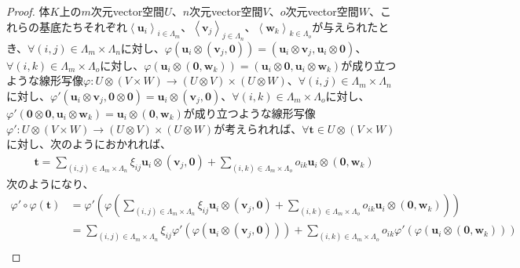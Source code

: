 \documentclass[dvipdfmx]{jsarticle}
\begin{document}
\begin{proof}
体$K$上の$m$次元vector空間$U$、$n$次元vector空間$V$、$o$次元vector空間$W$、これらの基底たちそれぞれ$\left\langle \mathbf{u}_{i} \right\rangle_{i \in \varLambda_{m}}$、$\left\langle \mathbf{v}_{j} \right\rangle_{j \in \varLambda_{n}}$、$\left\langle \mathbf{w}_{k} \right\rangle_{k \in \varLambda_{o}}$が与えられたとき、$\forall(i,j) \in \varLambda_{m} \times \varLambda_{n}$に対し、$\varphi\left( \mathbf{u}_{i} \otimes \left( \mathbf{v}_{j},\mathbf{0} \right) \right) = \left( \mathbf{u}_{i} \otimes \mathbf{v}_{j},\mathbf{u}_{i} \otimes \mathbf{0} \right)$、$\forall(i,k) \in \varLambda_{m} \times \varLambda_{o}$に対し、$\varphi\left( \mathbf{u}_{i} \otimes \left( \mathbf{0},\mathbf{w}_{k} \right) \right) = \left( \mathbf{u}_{i} \otimes \mathbf{0},\mathbf{u}_{i} \otimes \mathbf{w}_{k} \right)$が成り立つような線形写像$\varphi:U \otimes (V \times W) \rightarrow (U \otimes V) \times (U \otimes W)$、$\forall(i,j) \in \varLambda_{m} \times \varLambda_{n}$に対し、$\varphi'\left( \mathbf{u}_{i} \otimes \mathbf{v}_{j},\mathbf{0} \otimes \mathbf{0} \right) = \mathbf{u}_{i} \otimes \left( \mathbf{v}_{j},\mathbf{0} \right)$、$\forall(i,k) \in \varLambda_{m} \times \varLambda_{o}$に対し、$\varphi'\left( \mathbf{0} \otimes \mathbf{0},\mathbf{u}_{i} \otimes \mathbf{w}_{k} \right) = \mathbf{u}_{i} \otimes \left( \mathbf{0},\mathbf{w}_{k} \right)$が成り立つような線形写像$\varphi':U \otimes (V \times W) \rightarrow (U \otimes V) \times (U \otimes W)$が考えられれば、$\forall\mathbf{t} \in U \otimes (V \times W)$に対し、次のようにおかれれば、
\begin{align*}
\mathbf{t} = \sum_{(i,j) \in \varLambda_{m} \times \varLambda_{n}} {\xi_{ij}\mathbf{u}_{i} \otimes \left( \mathbf{v}_{j},\mathbf{0} \right)} + \sum_{(i,k) \in \varLambda_{m} \times \varLambda_{o}} {o_{ik}\mathbf{u}_{i} \otimes \left( \mathbf{0},\mathbf{w}_{k} \right)}
\end{align*}
次のようになり、
\begin{align*}
\varphi' \circ \varphi\left( \mathbf{t} \right) &= \varphi'\left( \varphi\left( \sum_{(i,j) \in \varLambda_{m} \times \varLambda_{n}} {\xi_{ij}\mathbf{u}_{i} \otimes \left( \mathbf{v}_{j},\mathbf{0} \right)} + \sum_{(i,k) \in \varLambda_{m} \times \varLambda_{o}} {o_{ik}\mathbf{u}_{i} \otimes \left( \mathbf{0},\mathbf{w}_{k} \right)} \right) \right)\\
&= \sum_{(i,j) \in \varLambda_{m} \times \varLambda_{n}} {\xi_{ij}\varphi'\left( \varphi\left( \mathbf{u}_{i} \otimes \left( \mathbf{v}_{j},\mathbf{0} \right) \right) \right)} + \sum_{(i,k) \in \varLambda_{m} \times \varLambda_{o}} {o_{ik}\varphi'\left( \varphi\left( \mathbf{u}_{i} \otimes \left( \mathbf{0},\mathbf{w}_{k} \right) \right) \right)}\\

\end{align*}
\end{proof}
\end{document}

